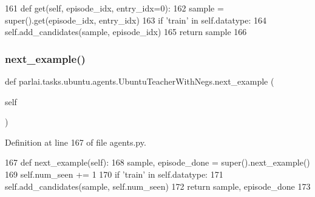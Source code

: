 \begin{DoxyCode}
161     \textcolor{keyword}{def }get(self, episode\_idx, entry\_idx=0):
162         sample = super().get(episode\_idx, entry\_idx)
163         \textcolor{keywordflow}{if} \textcolor{stringliteral}{'train'} \textcolor{keywordflow}{in} self.datatype:
164             self.add\_candidates(sample, episode\_idx)
165         \textcolor{keywordflow}{return} sample
166 
\end{DoxyCode}
\mbox{\label{classparlai_1_1tasks_1_1ubuntu_1_1agents_1_1UbuntuTeacherWithNegs_aef77d69155c1215eb64ec5c1ba895bdf}} 
\subsubsection{\texorpdfstring{next\+\_\+example()}{next\_example()}}
{\footnotesize\ttfamily def parlai.\+tasks.\+ubuntu.\+agents.\+Ubuntu\+Teacher\+With\+Negs.\+next\+\_\+example (\begin{DoxyParamCaption}\item[{}]{self }\end{DoxyParamCaption})}



Definition at line 167 of file agents.\+py.


\begin{DoxyCode}
167     \textcolor{keyword}{def }next\_example(self):
168         sample, episode\_done = super().next\_example()
169         self.num\_seen += 1
170         \textcolor{keywordflow}{if} \textcolor{stringliteral}{'train'} \textcolor{keywordflow}{in} self.datatype:
171             self.add\_candidates(sample, self.num\_seen)
172         \textcolor{keywordflow}{return} sample, episode\_done
173 
\end{DoxyCode}
\mbox{\label{classparlai_1_1tasks_1_1ubuntu_1_1agents_1_1UbuntuTeacherWithNegs_aacac8ac1f8b79287b943b85ed21b081b}} 
